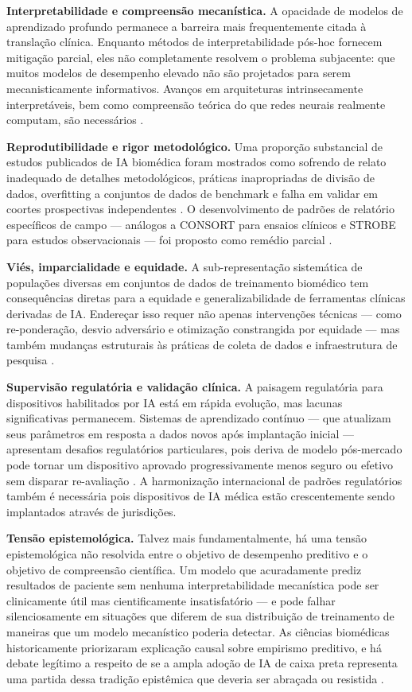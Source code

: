 \textbf{Interpretabilidade e compreensão mecanística.} A opacidade de modelos de aprendizado profundo permanece a barreira mais frequentemente citada à translação clínica. Enquanto métodos de interpretabilidade pós-hoc fornecem mitigação parcial, eles não completamente resolvem o problema subjacente: que muitos modelos de desempenho elevado não são projetados para serem mecanisticamente informativos. Avanços em arquiteturas intrinsecamente interpretáveis, bem como compreensão teórica do que redes neurais realmente computam, são necessários \parencite{rudin2019}.

\textbf{Reprodutibilidade e rigor metodológico.} Uma proporção substancial de estudos publicados de IA biomédica foram mostrados como sofrendo de relato inadequado de detalhes metodológicos, práticas inapropriadas de divisão de dados, overfitting a conjuntos de dados de benchmark e falha em validar em coortes prospectivas independentes \parencite{kapoor2023, wynants2020}. O desenvolvimento de padrões de relatório específicos de campo --- análogos a CONSORT para ensaios clínicos e STROBE para estudos observacionais --- foi proposto como remédio parcial \parencite{mongan2020}.

\textbf{Viés, imparcialidade e equidade.} A sub-representação sistemática de populações diversas em conjuntos de dados de treinamento biomédico tem consequências diretas para a equidade e generalizabilidade de ferramentas clínicas derivadas de IA. Endereçar isso requer não apenas intervenções técnicas --- como re-ponderação, desvio adversário e otimização constrangida por equidade --- mas também mudanças estruturais às práticas de coleta de dados e infraestrutura de pesquisa \parencite{obermeyer2019}.

\textbf{Supervisão regulatória e validação clínica.} A paisagem regulatória para dispositivos habilitados por IA está em rápida evolução, mas lacunas significativas permanecem. Sistemas de aprendizado contínuo --- que atualizam seus parâmetros em resposta a dados novos após implantação inicial --- apresentam desafios regulatórios particulares, pois deriva de modelo pós-mercado pode tornar um dispositivo aprovado progressivamente menos seguro ou efetivo sem disparar re-avaliação \parencite{fda2023}. A harmonização internacional de padrões regulatórios também é necessária pois dispositivos de IA médica estão crescentemente sendo implantados através de jurisdições.

\textbf{Tensão epistemológica.} Talvez mais fundamentalmente, há uma tensão epistemológica não resolvida entre o objetivo de desempenho preditivo e o objetivo de compreensão científica. Um modelo que acuradamente prediz resultados de paciente sem nenhuma interpretabilidade mecanística pode ser clinicamente útil mas cientificamente insatisfatório --- e pode falhar silenciosamente em situações que diferem de sua distribuição de treinamento de maneiras que um modelo mecanístico poderia detectar. As ciências biomédicas historicamente priorizaram explicação causal sobre empirismo preditivo, e há debate legítimo a respeito de se a ampla adoção de IA de caixa preta representa uma partida dessa tradição epistêmica que deveria ser abraçada ou resistida \parencite{lipton2018}.

